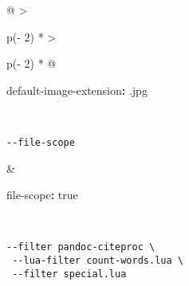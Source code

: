 \documentclass[
  a4paper,
]{article}
\newenvironment{Shaded}{}{}
\newcommand{\AttributeTok}[1]{\textcolor[rgb]{0.49,0.56,0.16}{#1}}
\newcommand{\CharTok}[1]{\textcolor[rgb]{0.25,0.44,0.63}{#1}}
\newcommand{\FunctionTok}[1]{\textcolor[rgb]{0.02,0.16,0.49}{#1}}
\newcommand{\KeywordTok}[1]{\textcolor[rgb]{0.00,0.44,0.13}{\textbf{#1}}}
\newcommand{\StringTok}[1]{\textcolor[rgb]{0.25,0.44,0.63}{#1}}
\begin{document}
\begin{longtable}[]{@{}
  >{\raggedright\arraybackslash}p{(\columnwidth - 2\tabcolsep) * }
  >{\raggedright\arraybackslash}p{(\columnwidth - 2\tabcolsep) * }@{}}
\begin{minipage}[t]{\linewidth}
\begin{Shaded}
\begin{Highlighting}[]
\FunctionTok{default{-}image{-}extension}\KeywordTok{:}\AttributeTok{ }\StringTok{\textquotesingle{}.jpg\textquotesingle{}}
\end{Highlighting}
\end{Shaded}
\end{minipage} \\
\begin{minipage}[t]{\linewidth}\raggedright
\begin{verbatim}
--file-scope
\end{verbatim}
\end{minipage} & \begin{minipage}[t]{\linewidth}\raggedright
\begin{Shaded}
\begin{Highlighting}[]
\FunctionTok{file{-}scope}\KeywordTok{:}\AttributeTok{ }\CharTok{true}
\end{Highlighting}
\end{Shaded}
\end{minipage} \\
\begin{minipage}[t]{\linewidth}\raggedright
\begin{verbatim}
--filter pandoc-citeproc \
 --lua-filter count-words.lua \
 --filter special.lua


\end{verbatim}
\end{minipage}
\end{longtable}
\end{document}
